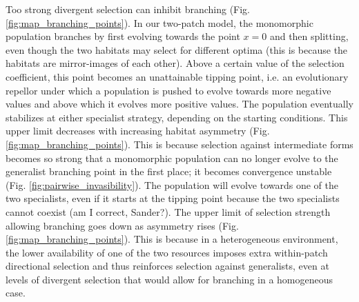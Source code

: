 
Too strong divergent selection can inhibit branching (Fig. \ref{fig:map_branching_points}). In our two-patch model, the monomorphic population branches by first evolving towards the point $x = 0$ and then splitting, even though the two habitats may select for different optima (this is because the habitats are mirror-images of each other). Above a certain value of the selection coefficient, this point becomes an unattainable tipping point, i.e. an evolutionary repellor under which a population is pushed to evolve towards more negative values and above which it evolves more positive values. The population eventually stabilizes at either specialist strategy, depending on the starting conditions. This upper limit decreases with increasing habitat asymmetry (Fig. \ref{fig:map_branching_points}). This is because selection against intermediate forms becomes so strong that a monomorphic population can no longer evolve to the generalist branching point in the first place; it becomes convergence unstable (Fig. \ref{fig:pairwise_invasibility}). The population will evolve towards one of the two specialists, even if it starts at the tipping point because the two specialists cannot coexist (am I correct, Sander?). The upper limit of selection strength allowing branching goes down as asymmetry rises (Fig. \ref{fig:map_branching_points}). This is because in a heterogeneous environment, the lower availability of one of the two resources imposes extra within-patch directional selection and thus reinforces selection against generalists, even at levels of divergent selection that would allow for branching in a homogeneous case.\\


